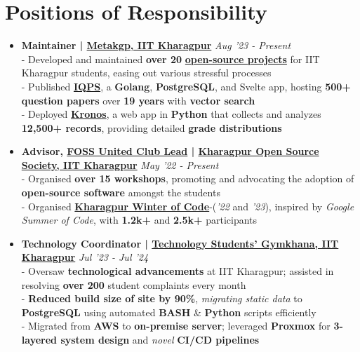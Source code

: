 \documentclass[a4paper,10pt]{extarticle} %
\begin{document}
\section{\textcolor{primary}{Positions of Responsibility}}
\vspace{+0.2cm}

\begin{itemize}[leftmargin=0.55cm, rightmargin=0.2cm, label={\Large\textbullet}]

\item \textbf{Maintainer | \href{https://metakgp.org/}{Metakgp, IIT Kharagpur}} \hfill{\textit{Aug '23 - Present}}\\
- Developed and maintained \textbf{over 20} \textbf{\href{https://github.com/metakgp}{open-source projects}} for IIT Kharagpur students, easing out various stressful processes \\
- Published \href{https://qp.metakgp.org}{\textbf{IQPS}}, a \textbf{Golang}, \textbf{PostgreSQL}, and Svelte app, hosting \textbf{500+ question papers} over \textbf{19 years} with \textbf{vector search} \\
- Deployed \href{https://kronos.streamlit.app}{\textbf{Kronos}}, a web app in \textbf{Python} that collects and analyzes \textbf{12,500+ records}, providing detailed \textbf{grade distributions}

\item \textbf{Advisor, \href{https://fossunited.org/clubs}{\textbf{FOSS United Club Lead}} | \href{https://kossiitkgp.org}{Kharagpur Open Source Society, IIT Kharagpur}} \hfill{\textit{May '22 - Present}}\\
- Organised \textbf{over 15 workshops}, promoting and advocating the adoption of \textbf{open-source software} amongst the students \\
- Organised \textbf{\href{https://kwoc.kossiitkgp.org/}{Kharagpur Winter of Code}}-(\textit{'22} and \textit{'23}), inspired by \textit{Google Summer of Code}, with \textbf{1.2k+} and \textbf{2.5k+} participants

\item \textbf{Technology Coordinator | \href{https://gymkhana.iitkgp.ac.in/}{Technology Students' Gymkhana, IIT Kharagpur}} \hfill{\textit{Jul '23 - Jul '24}}\\
- Oversaw \textbf{technological advancements} at IIT Kharagpur;  assisted in resolving \textbf{over 200} student complaints every month \\
- \textbf{Reduced build size of site by 90\%}, \textit{migrating static data} to \textbf{PostgreSQL} using automated \textbf{BASH} \& \textbf{Python} scripts efficiently \\
- Migrated from \textbf{AWS} to \textbf{on-premise server}; leveraged \textbf{Proxmox} for \textbf{3-layered system design} and \textit{novel} \textbf{CI/CD pipelines}

\end{itemize}
\end{document}
